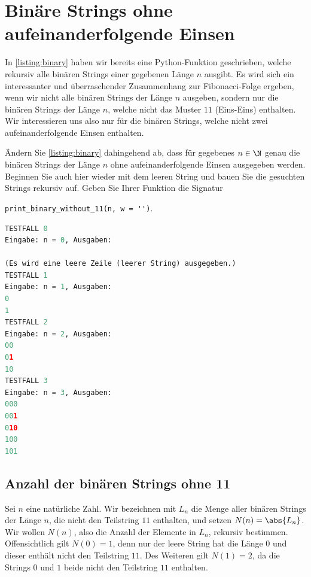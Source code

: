 \chapter{Binäre Strings ohne aufeinanderfolgende Einsen}\label{ch:Kapitel04}
In \cref{listing:binary} haben wir bereits eine Python-Funktion geschrieben, welche rekursiv alle binären Strings einer gegebenen Länge $n$ ausgibt. Es wird sich ein interessanter und überraschender Zusammenhang zur Fibonacci-Folge ergeben, wenn wir nicht alle binären Strings der Länge $n$ ausgeben, sondern nur die binären Strings der Länge $n$, welche nicht das Muster $11$ (Eins-Eins) enthalten. Wir interessieren uns also nur für die binären Strings, welche nicht zwei aufeinanderfolgende Einsen enthalten.
\begin{myexercise}\label{myexercise:0401}
	Ändern Sie \cref{listing:binary} dahingehend ab, dass für gegebenes $n\in\N$ genau die binären Strings der Länge $n$ ohne aufeinanderfolgende Einsen ausgegeben werden. Beginnen Sie auch hier wieder mit dem leeren String und bauen Sie die gesuchten Strings rekursiv auf. Geben Sie Ihrer Funktion die Signatur

	\lstinline|print_binary_without_11(n, w = '')|.
	\begin{lstlisting}[language=Python,caption=binäre Strings ohne 11 rekursiv ausgeben,numbers=none]
TESTFALL 0
Eingabe: n = 0, Ausgaben:

(Es wird eine leere Zeile (leerer String) ausgegeben.)
TESTFALL 1
Eingabe: n = 1, Ausgaben:
0
1
TESTFALL 2
Eingabe: n = 2, Ausgaben:
00
01
10
TESTFALL 3
Eingabe: n = 3, Ausgaben:
000
001
010
100
101
\end{lstlisting}
\end{myexercise}

\clearpage


\section{Anzahl der binären Strings ohne 11}
Sei $n$ eine natürliche Zahl. Wir bezeichnen mit $L_n$ die Menge aller binären Strings der Länge $n$, die nicht den Teilstring $11$ enthalten, und setzen $N(n) = \abs{L_n}$. Wir wollen $N(n)$, also die Anzahl der Elemente in $L_n$, rekursiv bestimmen. Offensichtlich gilt $N(0) = 1$, denn nur der leere String hat die Länge $0$ und dieser enthält nicht den Teilstring $11$. Des Weiteren gilt $N(1) = 2$, da die Strings $0$ und $1$ beide nicht den Teilstring $11$ enthalten.

